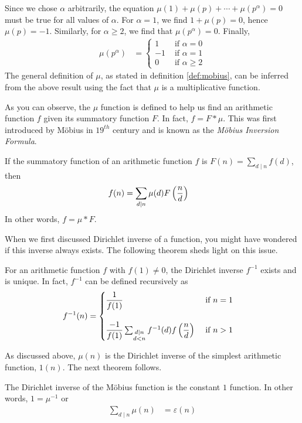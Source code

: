 Since we chose $\alpha$ arbitrarily, the equation $\mu(1) + \mu(p) + \cdots + \mu(p^\alpha)=0$ must be true for all values of $\alpha$. For $\alpha=1$, we find $1 + \mu(p) = 0$, hence $\mu(p)=-1$. Similarly, for $\alpha\geq 2$, we find that $\mu(p^\alpha)=0$. Finally,
	\begin{align*}
		\mu(p^\alpha) & = \begin{cases}
		1&\mbox{ if }\alpha=0\\
		-1&\mbox{ if }\alpha=1\\
		0&\mbox{ if }\alpha\geq 2
		\end{cases}
	\end{align*}
The general definition of $\mu$, as stated in definition \ref{def:mobius}, can be inferred from the above result using the fact that $\mu$ is a multiplicative function.

As you can observe, the $\mu$ function is defined to help us find an arithmetic function $f$ given its summatory function $F$. In fact, $f=F \ast \mu$. This was first introduced by M\"{o}bius in $19^{th}$ century and is known as the \textit{M\"{o}bius Inversion Formula}.

	\begin{theorem}
		\label{thm:mobinv}
		If the summatory function of an arithmetic function $f$ is $F(n)=\sum\limits_{d\mid n}f(d)$, then
		\begin{align*}
			f(n) & =\sum_{d\mid n}\mu(d)F\left(\frac nd\right)
		\end{align*}
		In other words, $f=\mu\ast F$.
	\end{theorem}


When we first discussed Dirichlet inverse of a function, you might have wondered if this inverse always exists. The following theorem sheds light on this issue.

	\begin{theorem} \label{thm:dirichletinverse}
		For an arithmetic function $f$ with $f(1)\neq0$, the Dirichlet inverse $f^{-1}$ exists and is unique. In fact, $f^{-1}$ can be defined recursively as
			\begin{align*}
				f^{-1}(n)
					& =
					\begin{cases}
						\dfrac1{f(1)}&\mbox{ if }n=1\\ \\
						\dfrac{-1}{f(1)}\sum_{\substack{d\mid n\\d<n}}f^{-1}(d)f\left(\dfrac nd\right)&\mbox{ if }n>1\\
					\end{cases}
	\end{align*}
	\end{theorem}
As discussed above, $\mu(n)$ is the Dirichlet inverse of the simplest arithmetic function, $1(n)$. The next theorem follows.
	\begin{theorem}
		\label{thm:mobiusinverse}
		The Dirichlet inverse of the M\"{o}bius function is the constant $1$ function. In other words, $1=\mu^{-1}$ or
			\begin{align*}
				\sum_{d\mid n}\mu(n) & =\varepsilon(n)
			\end{align*}
	\end{theorem}

